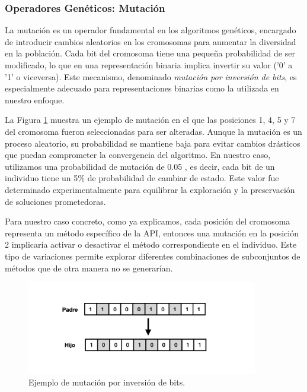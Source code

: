 \subsubsection{Operadores Genéticos: Mutación}

La mutación es un operador fundamental en los algoritmos genéticos, encargado de introducir cambios aleatorios en los cromosomas para aumentar la diversidad en la población.  
Cada bit del cromosoma tiene una pequeña probabilidad de ser modificado, lo que en una representación binaria implica invertir su valor ('0' a '1' o viceversa).  
Este mecanismo, denominado \emph{mutación por inversión de bits}, es especialmente adecuado para representaciones binarias como la utilizada en nuestro enfoque. 

La Figura \ref{fig:mutation} muestra un ejemplo de mutación en el que las posiciones 1, 4, 5 y 7 del cromosoma fueron seleccionadas para ser alteradas.  
Aunque la mutación es un proceso aleatorio, su probabilidad se mantiene baja para evitar cambios drásticos que puedan comprometer la convergencia del algoritmo.  
En nuestro caso, utilizamos una probabilidad de mutación de 0.05 , es decir, cada bit de un individuo tiene un 5\% de probabilidad de cambiar de estado.  
Este valor fue determinado experimentalmente para equilibrar la exploración y la preservación de soluciones prometedoras.

Para nuestro caso concreto, como ya explicamos, cada posición del cromosoma representa un método específico de la API, entonces una mutación en la posición 2 implicaría activar o desactivar el método
correspondiente en el individuo.
Este tipo de variaciones permite explorar diferentes combinaciones de subconjuntos de métodos que de otra manera no se generarían.  

\begin{figure}
    \centering
    \includegraphics[width=0.9\textwidth]{images/mutation.png}
    \caption{Ejemplo de mutación por inversión de bits.}
    \label{fig:mutation}
    \end{figure}
